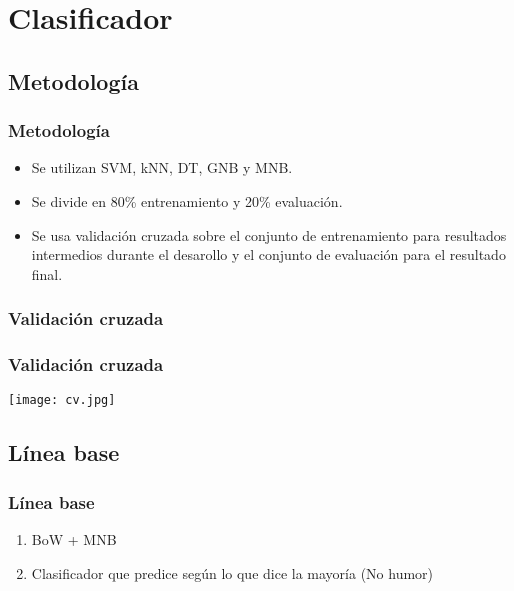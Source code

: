 \section{Clasificador}

\subsection{Metodología}
\begin{frame}
    \frametitle{Metodología}

    \begin{itemize}
        \item Se utilizan SVM, kNN, DT, GNB y MNB.
        \item Se divide en 80\% entrenamiento y 20\% evaluación.
        \item Se usa validación cruzada sobre el conjunto de entrenamiento para resultados intermedios durante el desarollo y el conjunto de evaluación para el resultado final.
    \end{itemize}
\end{frame}

\subsubsection{Validación cruzada}
\begin{frame}
    \frametitle{Validación cruzada}
    
    \begin{center}
        \texttt{[image: cv.jpg]}
    \end{center}
\end{frame}


\subsection{Línea base}
\begin{frame}
    \frametitle{Línea base}

    \begin{enumerate}
        \item BoW + MNB
        \item Clasificador que predice según lo que dice la mayoría (No humor)
    \end{enumerate}
\end{frame}

